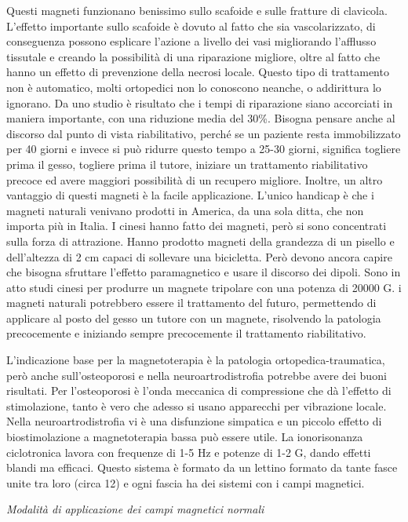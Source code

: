 \documentclass[]{article}
\begin{document}
Questi magneti funzionano benissimo sullo scafoide e sulle fratture di
clavicola. L'effetto importante sullo scafoide è dovuto al fatto che sia
vascolarizzato, di conseguenza possono esplicare l'azione a livello dei
vasi migliorando l'afflusso tissutale e creando la possibilità di una
riparazione migliore, oltre al fatto che hanno un effetto di prevenzione
della necrosi locale. Questo tipo di trattamento non è automatico, molti
ortopedici non lo conoscono neanche, o addirittura lo ignorano. Da uno
studio è risultato che i tempi di riparazione siano accorciati in
maniera importante, con una riduzione media del 30\%. Bisogna pensare
anche al discorso dal punto di vista riabilitativo, perché se un
paziente resta immobilizzato per 40 giorni e invece si può ridurre
questo tempo a 25-30 giorni, significa togliere prima il gesso, togliere
prima il tutore, iniziare un trattamento riabilitativo precoce ed avere
maggiori possibilità di un recupero migliore. Inoltre, un altro
vantaggio di questi magneti è la facile applicazione. L'unico handicap è
che i magneti naturali venivano prodotti in America, da una sola ditta,
che non importa più in Italia. I cinesi hanno fatto dei magneti, però si
sono concentrati sulla forza di attrazione. Hanno prodotto magneti della
grandezza di un pisello e dell'altezza di 2 cm capaci di sollevare una
bicicletta. Però devono ancora capire che bisogna sfruttare l'effetto
paramagnetico e usare il discorso dei dipoli. Sono in atto studi cinesi
per produrre un magnete tripolare con una potenza di 20000 G. i magneti
naturali potrebbero essere il trattamento del futuro, permettendo di
applicare al posto del gesso un tutore con un magnete, risolvendo la
patologia precocemente e iniziando sempre precocemente il trattamento
riabilitativo.

L'indicazione base per la magnetoterapia è la patologia
ortopedica-traumatica, però anche sull'osteoporosi e nella
neuroartrodistrofia potrebbe avere dei buoni risultati. Per
l'osteoporosi è l'onda meccanica di compressione che dà l'effetto di
stimolazione, tanto è vero che adesso si usano apparecchi per vibrazione
locale. Nella neuroartrodistrofia vi è una disfunzione simpatica e un
piccolo effetto di biostimolazione a magnetoterapia bassa può essere
utile. La ionorisonanza ciclotronica lavora con frequenze di 1-5 Hz e
potenze di 1-2 G, dando effetti blandi ma efficaci. Questo sistema è
formato da un lettino formato da tante fasce unite tra loro (circa 12) e
ogni fascia ha dei sistemi con i campi magnetici.

\emph{Modalità di applicazione dei campi magnetici normali}
\end{document}
